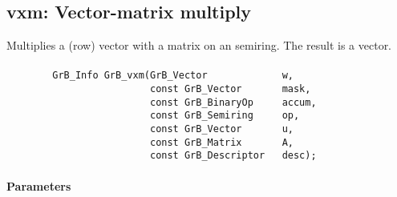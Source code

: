 




\subsection{{\sf vxm}: Vector-matrix multiply}

Multiplies a (row) vector with a matrix on an semiring. The result is a vector.

\paragraph{\syntax}

\begin{verbatim}
        GrB_Info GrB_vxm(GrB_Vector             w,
                         const GrB_Vector       mask,
                         const GrB_BinaryOp     accum,
                         const GrB_Semiring     op,
                         const GrB_Vector       u, 
                         const GrB_Matrix       A,
                         const GrB_Descriptor   desc);
\end{verbatim}

\paragraph{Parameters}

